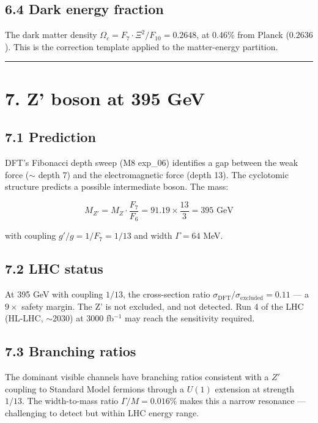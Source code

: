 \documentclass[11pt,a4paper]{article}
\begin{document}
\subsection*{6.4 Dark energy fraction}

The dark matter density $\Omega_c = F_7 \cdot \Xi^2 / F_{10} = 0.2648$, at 0.46\% from Planck ($0.2636$). This is the correction template applied to the matter-energy partition.

\begin{center}\rule{0.5\linewidth}{0.4pt}\end{center}

\section*{7. Z' boson at 395 GeV}

\subsection*{7.1 Prediction}

DFT's Fibonacci depth sweep (M8 exp\_06) identifies a gap between the weak force ($\sim$ depth 7) and the electromagnetic force (depth 13). The cyclotomic structure predicts a possible intermediate boson. The mass:

\[M_{Z'} = M_Z \cdot \frac{F_7}{F_6} = 91.19 \times \frac{13}{3} = 395 \text{ GeV}\]

with coupling $g'/g = 1/F_7 = 1/13$ and width $\Gamma = 64$ MeV.

\subsection*{7.2 LHC status}

At 395 GeV with coupling $1/13$, the cross-section ratio $\sigma_{\text{DFT}}/\sigma_{\text{excluded}} = 0.11$ — a $9\times$ safety margin. The Z' is not excluded, and not detected. Run 4 of the LHC (HL-LHC, $\sim 2030$) at 3000 fb$^{-1}$ may reach the sensitivity required.

\subsection*{7.3 Branching ratios}

The dominant visible channels have branching ratios consistent with a $Z'$ coupling to Standard Model fermions through a $U(1)$ extension at strength $1/13$. The width-to-mass ratio $\Gamma/M = 0.016\%$ makes this a narrow resonance — challenging to detect but within LHC energy range.
\end{document}
